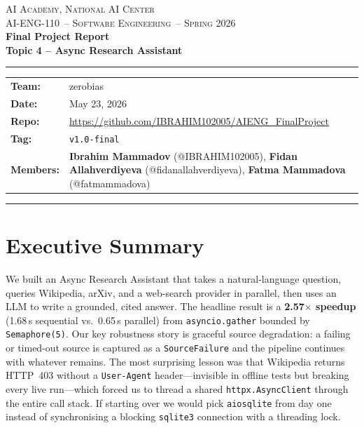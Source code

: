 \documentclass[11pt,a4paper]{article}
\newcommand{\teamname}{zerobias}
\newcommand{\topicchoice}{Topic 4 -- Async Research Assistant}
\newcommand{\member}[2]{\textbf{#1} (#2)}
\newcommand{\reportdate}{May 23, 2026}
\newcommand{\repolink}{https://github.com/IBRAHIM102005/AIENG\_FinalProject}
\newcommand{\coursecode}{AI-ENG-110}
\newcommand{\coursename}{Software Engineering}
\newcommand{\institution}{AI Academy, National AI Center}
\newcommand{\semester}{Spring 2026}
\begin{document}
\begin{center}
{\small \textsc{\institution} \\[0.2em] \textsc{\coursecode\ -- \coursename\ -- \semester}}\\[1.2em]
{\Large\bfseries\color{accent} Final Project Report}\\[0.3em]
{\LARGE\bfseries \topicchoice}\\[0.6em]
\rule{0.85\textwidth}{0.6pt}
\end{center}

\vspace{0.6em}
\begin{tabularx}{\textwidth}{@{}l X @{}}
\textbf{Team:}    & \teamname \\
\textbf{Date:}    & \reportdate \\
\textbf{Repo:}    & \url{\repolink} \\ %
\textbf{Tag:}     & \texttt{v1.0-final} \\
\textbf{Members:} & \member{Ibrahim Mammadov}{@IBRAHIM102005},\quad
                    \member{Fidan Allahverdiyeva}{@fidanallahverdiyeva},\quad
                    \member{Fatma Mammadova}{@fatmammadova} \\
\end{tabularx}
\vspace{0.4em}\hrule\vspace{0.6em}

\section*{Executive Summary}

We built an Async Research Assistant that takes a natural-language question, queries Wikipedia, arXiv, and a web-search provider in parallel, then uses an LLM to write a grounded, cited answer. The headline result is a \textbf{2.57$\times$ speedup} (1.68\,s sequential vs.\ 0.65\,s parallel) from \texttt{asyncio.gather} bounded by \texttt{Semaphore(5)}. Our key robustness story is graceful source degradation: a failing or timed-out source is captured as a \texttt{SourceFailure} and the pipeline continues with whatever remains. The most surprising lesson was that Wikipedia returns HTTP~403 without a \texttt{User-Agent} header---invisible in offline tests but breaking every live run---which forced us to thread a shared \texttt{httpx.AsyncClient} through the entire call stack. If starting over we would pick \texttt{aiosqlite} from day one instead of synchronising a blocking \texttt{sqlite3} connection with a threading lock.
\end{document}
